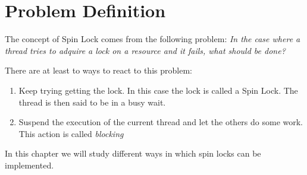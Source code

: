 \section{Problem Definition}
The concept of Spin Lock comes from the following problem: \textit{In the case where a thread tries to adquire a lock on a resource and it fails, what should be done?}
\par
There are at least to ways to react to this problem:
\begin{enumerate}
\item Keep trying getting the lock. In this case the lock is called a Spin Lock. The thread is then said to be in a busy wait.
\item Suspend the execution of the current thread and let the others do some work. This action is called \textit{blocking}
\end{enumerate}
\par
In this chapter we will study different ways in which spin locks can be implemented.